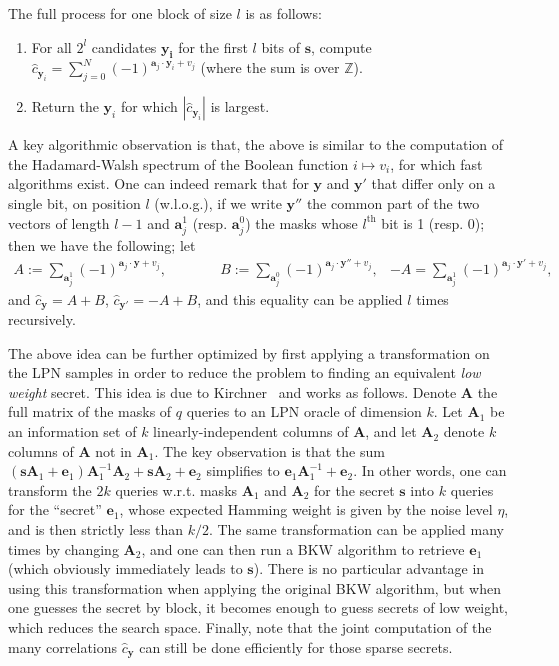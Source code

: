 \documentclass[11pt,a4paper]{article}
\theoremstyle{definition}
\begin{document}
The full process for one block of size $l$ is as follows:
\begin{enumerate}
	\item For all $2^l$ candidates $\bm{y_i}$ for the first $l$ bits of $\bm{s}$, compute $\hat{c}_{\bm{y}_i} = \sum_{j = 0}^N (-1)^{\bm{a}_j\cdot\bm{y}_i+v_j}$ (where the sum is over $\mathbb{Z}$).
	\item Return the $\bm{y}_i$ for which $|\hat{c}_{\bm{y}_i}|$ is largest.
\end{enumerate}
A key algorithmic observation is that, the above is similar to the computation of the Hadamard-Walsh spectrum of the Boolean function $i \mapsto v_i$, for which fast algorithms exist. One can indeed
remark that for $\bm{y}$ and $\bm{y}'$ that differ only on a single bit, on position $l$ (w.l.o.g.), if we write $\bm{y}''$ the common part of the two vectors of length $l-1$ and
$\bm{a}_j^1$ (resp. $\bm{a}_j^0$) the masks whose $l^\text{th}$ bit is 1 (resp. 0); then we have the following; let
\begin{align*}
A := \sum_{\bm{a}_j^1}(-1)^{\bm{a}_j\cdot\bm{y}+v_j}, \qquad&
\quad B := \sum_{\bm{a}_j^0}(-1)^{\bm{a}_j\cdot\bm{y}''+v_j}, &
-A = \sum_{\bm{a}_j^1}(-1)^{\bm{a}_j\cdot\bm{y}'+v_j},
\end{align*}
and	$\hat{c}_{\bm{y}} = A + B$, $\hat{c}_{\bm{y}'} = -A + B$, and this equality can be applied $l$ times recursively.

\medskip

The above idea can be further optimized by first applying a transformation on the LPN samples in order to reduce the problem to finding an equivalent \emph{low weight} secret. This idea is due
to Kirchner~\cite{paul_lpn} and works as follows. Denote $\bm{A}$ the full matrix of the masks of $q$ queries to an LPN oracle of dimension $k$. Let $\bm{A}_1$ be an information set of $k$
linearly-independent columns of $\bm{A}$, and let $\bm{A}_2$ denote $k$ columns of $\bm{A}$ not in $\bm{A}_1$. The key observation is that the sum $(\bm{s}\bm{A}_1 + \bm{e}_1)\bm{A}_1^{-1}\bm{A}_2
+ \bm{s}\bm{A}_2 + \bm{e}_2$ simplifies to $\bm{e}_1\bm{A}_1^{-1} + \bm{e}_2$. In other words, one can transform the $2k$ queries w.r.t. masks $\bm{A}_1$ and $\bm{A}_2$ for the secret $\bm{s}$
into $k$ queries for the ``secret'' $\bm{e}_1$, whose expected Hamming weight is given by the noise level $\eta$, and is then strictly less than $k/2$. The same transformation can
be applied many times by changing $\bm{A}_2$, and one can then run a BKW algorithm to retrieve $\bm{e}_1$ (which obviously immediately leads to $\bm{s}$). There is no particular advantage
in using this transformation when applying the original BKW algorithm, but when one guesses the secret by block, it becomes enough to guess secrets of low weight, which reduces
the search space. Finally, note that the joint computation of the many correlations $\hat{c}_{\bm{y}}$ can still be done efficiently for those sparse secrets.
\end{document}
